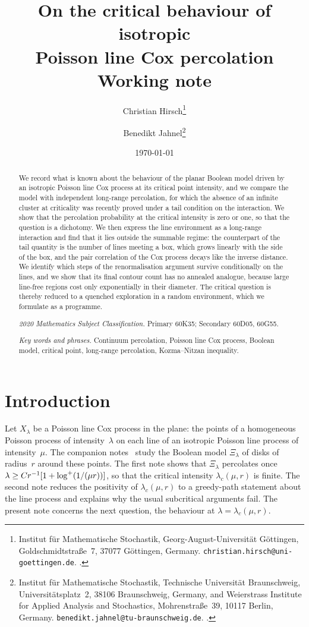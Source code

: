 \documentclass[11pt,letterpaper]{article}
\title{\textbf{On the critical behaviour of isotropic\\ Poisson line Cox percolation}\\[0.6em] \large Working note}
\author{%
  Christian Hirsch\thanks{Institut f\"ur Mathematische Stochastik, Georg-August-Universit\"at G\"ottingen, Goldschmidtstra\ss e~7, 37077 G\"ottingen, Germany. \texttt{christian.hirsch@uni-goettingen.de}. \orcid{0000-0003-4136-3740}.}
  \and
  Benedikt Jahnel\thanks{Institut f\"ur Mathematische Stochastik, Technische Universit\"at Braunschweig, Universit\"atsplatz~2, 38106 Braunschweig, Germany, and Weierstrass Institute for Applied Analysis and Stochastics, Mohrenstra\ss e~39, 10117 Berlin, Germany. \texttt{benedikt.jahnel@tu-braunschweig.de}. \orcid{0000-0002-4212-0065}.}%
}
\date{\today}
\begin{document}
\maketitle
\thispagestyle{plain}

\begin{abstract}
We record what is known about the behaviour of the planar Boolean model driven by an isotropic Poisson line Cox process at its critical point intensity, and we compare the model with independent long-range percolation, for which the absence of an infinite cluster at criticality was recently proved under a tail condition on the interaction. We show that the percolation probability at the critical intensity is zero or one, so that the question is a dichotomy. We then express the line environment as a long-range interaction and find that it lies outside the summable regime: the counterpart of the tail quantity is the number of lines meeting a box, which grows linearly with the side of the box, and the pair correlation of the Cox process decays like the inverse distance. We identify which steps of the renormalisation argument survive conditionally on the lines, and we show that its final contour count has no annealed analogue, because large line-free regions cost only exponentially in their diameter. The critical question is thereby reduced to a quenched exploration in a random environment, which we formulate as a programme.

\medskip
\noindent\textit{2020 Mathematics Subject Classification.} Primary 60K35; Secondary 60D05, 60G55.

\noindent\textit{Key words and phrases.} Continuum percolation, Poisson line Cox process, Boolean model, critical point, long-range percolation, Kozma--Nitzan inequality.
\end{abstract}

\section{Introduction}
\label{sec:introduction}

Let $X_\lambda$ be a Poisson line Cox process in the plane: the points of a homogeneous Poisson process of intensity~$\lambda$ on each line of an isotropic Poisson line process of intensity~$\mu$. The companion notes~\cite{HJ26,HJ26sub} study the Boolean model $\Xi_\lambda$ of disks of radius~$r$ around these points. The first note shows that $\Xi_\lambda$ percolates once $\lambda\ge Cr^{-1}[1+\log^{+}(1/(\mu r))]$, so that the critical intensity $\lambda_c(\mu,r)$ is finite. The second note reduces the positivity of $\lambda_c(\mu,r)$ to a greedy-path statement about the line process and explains why the usual subcritical arguments fail. The present note concerns the next question, the behaviour at $\lambda=\lambda_c(\mu,r)$.
\end{document}
